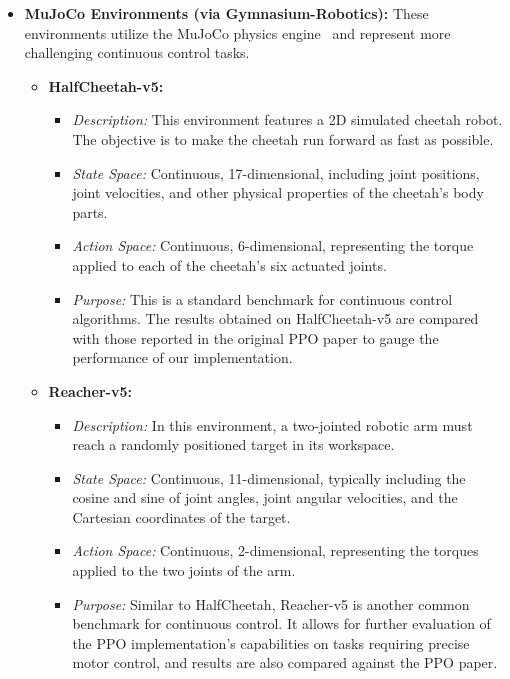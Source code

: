 \begin{itemize}
    \item \textbf{MuJoCo Environments (via Gymnasium-Robotics):} These environments utilize the MuJoCo physics engine~\cite{todorov2012mujoco} and represent more challenging continuous control tasks.
    \begin{itemize}
        \item \textbf{HalfCheetah-v5:}
        \begin{itemize}
            \item \textit{Description:} This environment features a 2D simulated cheetah robot. The objective is to make the cheetah run forward as fast as possible.
            \item \textit{State Space:} Continuous, 17-dimensional, including joint positions, joint velocities, and other physical properties of the cheetah's body parts.
            \item \textit{Action Space:} Continuous, 6-dimensional, representing the torque applied to each of the cheetah's six actuated joints.
            \item \textit{Purpose:} This is a standard benchmark for continuous control algorithms. The results obtained on HalfCheetah-v5 are compared with those reported in the original PPO paper to gauge the performance of our implementation.
        \end{itemize}
        \item \textbf{Reacher-v5:}
        \begin{itemize}
            \item \textit{Description:} In this environment, a two-jointed robotic arm must reach a randomly positioned target in its workspace.
            \item \textit{State Space:} Continuous, 11-dimensional, typically including the cosine and sine of joint angles, joint angular velocities, and the Cartesian coordinates of the target.
            \item \textit{Action Space:} Continuous, 2-dimensional, representing the torques applied to the two joints of the arm.
            \item \textit{Purpose:} Similar to HalfCheetah, Reacher-v5 is another common benchmark for continuous control. It allows for further evaluation of the PPO implementation's capabilities on tasks requiring precise motor control, and results are also compared against the PPO paper.
        \end{itemize}
    \end{itemize}
\end{itemize}